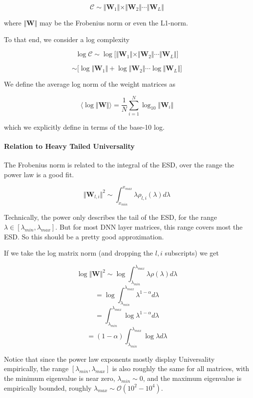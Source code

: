 $$\mathcal{C}\sim\Vert\mathbf{W}_{1}\Vert\times\Vert\mathbf{W}_{2}\Vert\cdots\Vert\mathbf{W}_{L}\Vert$$

where $\Vert\mathbf{W}\Vert$ may be the Frobenius norm or even the L1-norm.


 To that end, we consider a log complexity

$$\log\mathcal{C}\sim\log\bigg[\Vert\mathbf{W}_{1}\Vert\times\Vert\mathbf{W}_{2}\Vert\cdots\Vert\mathbf{W}_{L}\Vert\bigg]$$

$$\sim\bigg[\log\Vert\mathbf{W}_{1}\Vert+\log\Vert\mathbf{W}_{2}\Vert\cdots\log\Vert\mathbf{W}_{L}\Vert\bigg]$$

We define the average log norm of the weight matrices as

$$\langle\log\Vert\mathbf{W}\Vert\rangle=\dfrac{1}{N}\sum_{i=1}^{N}\log_{10}\Vert\mathbf{W}_{i}\Vert$$

which we explicitly define in terms of the base-10 log.

\paragraph{Relation to Heavy Tailed Universality}

The Frobenius norm is related to the integral of the ESD, over the range the power law is a good fit. 

$$\Vert\mathbf{W}_{l,i}\Vert^{2}\sim\int_{x_{min}}^{x_{max}}\lambda\rho_{l,i}(\lambda)d\lambda$$

Technically, the power only describes the tail of the ESD,  for the range $\lambda\in[\lambda_{min},\lambda_{max}]$.
  But for most DNN layer matrices, this range covers most the ESD.  So this should be a pretty good approximation.

If we take the log matrix norm (and dropping the $l,i$ subscripts) we get

$$\log\Vert\mathbf{W}\Vert^{2}\sim\log\int_{\lambda_{min}}^{\lambda_{max}}\lambda\rho(\lambda)d\lambda$$
$$=\log\int_{\lambda_{min}}^{\lambda_{max}}\lambda^{1-\alpha}d\lambda$$
$$=\int_{\lambda_{min}}^{\lambda_{max}}\log\lambda^{1-\alpha}d\lambda$$
$$=(1-\alpha)\int_{\lambda_{min}}^{\lambda_{max}}\log\lambda d\lambda$$

Notice that since the power law exponents mostly display Universality empirically, the range $[\lambda_{min},\lambda_{max}]$ is also roughly the same for all matrices, with the minimum eigenvalue is near zero, $\lambda_{min}\sim 0$, and the maximum eigenvalue is  empirically bounded, roughly $\lambda_{max}\sim\mathcal{O}(10^{2}-10^{4})$.  

